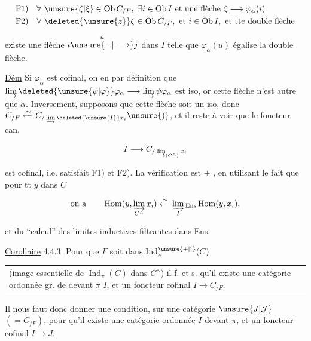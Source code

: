\[
\begin{aligned}
\mathrm{F1})\quad &\forall\ \unsure{\zeta|\xi}\in\operatorname{Ob} C_{/F},\ \exists i\in\operatorname{Ob} I\text{ et une flèche }\zeta\longrightarrow\varphi_\alpha(i)\\
\mathrm{F2})\quad &\forall\ \deleted{\unsure{z}}\zeta\in\operatorname{Ob} C_{/F},\ \text{et }i\in\operatorname{Ob} I,\text{ et tte double flèche}
\end{aligned}
\]



existe une flèche $i\overset{u}{\unsure{-|\longrightarrow}}j$ dans $I$ telle que $\varphi_\alpha(u)$ égalise la double flèche.

\uline{Dém} Si $\varphi_\alpha$ est cofinal, on en  par définition que $\varinjlim\deleted{\unsure{\psi|\varphi}}\varphi_\alpha\longrightarrow\varinjlim\psi\varphi_\alpha$ est iso, or cette flèche n'est autre que $\alpha$. Inversement, supposons que cette flèche soit un iso, donc $C_{/F}\xleftarrow{\sim}C_{/\varinjlim\deleted{\unsure{I}} x_i}\unsure{)}$, et il reste à voir que le foncteur can.

\[
I\longrightarrow C_{/\varinjlim_{(C^\wedge)}x_i}
\]

est cofinal, i.e. satisfait F1) et F2). La vérification est $\pm$ , en utilisant le fait que pour tt \deleted{\unsure{$\zeta$}}$y$ \deleted{\unsure{$\in$}} \inserted{$\leftarrow$} dans $C$ 

\[
\text{on a}\qquad \operatorname{Hom}(y,\varinjlim_{C^\wedge}x_i)\xleftarrow{\sim}\varinjlim_I{}_{\mathrm{Ens}}\operatorname{Hom}(y,x_i),
\]

et du ``calcul'' des limites inductives filtrantes dans Ens. \unsure{$\mathsection$|$\square$}

\uline{Corollaire} 4.4.3.  Pour que $F$ soit dans $\operatorname{Ind}^{\unsure{+|'}}_{\pi}(C)$\newline
\begin{tabular}{@{}|p{.91\linewidth}@{}}
(image essentielle de $\operatorname{Ind}_{\pi}(C)$ dans $C^\wedge$) il f. et s. qu'il existe une catégorie ordonnée gr. de devant $\pi$ $I$, et un foncteur cofinal $I\longrightarrow C_{/F}$.
\end{tabular}

Il  nous faut donc donner une condition, sur une catégorie $\unsure{J|\mathcal J}$ $(=C_{/F})$, pour qu'il existe une catégorie ordonnée $I$  devant $\pi$, et un foncteur cofinal $I\longrightarrow J$.

